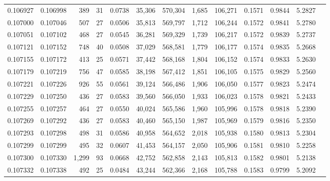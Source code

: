 \begin{tabular}{rrrrrrrrrrrrr}
0.106927 & 0.106998 &   389 &  31 &                                     0.0738 &  35,306 & 570,304 &   1,685 & 106,271 & 0.1571 & 0.9844 & 5.2827 \\
0.107000 & 0.107046 &   507 &  27 &                                     0.0506 &  35,813 & 569,797 &   1,712 & 106,244 & 0.1572 & 0.9841 & 5.2780 \\
0.107051 & 0.107102 &   468 &  27 &                                     0.0545 &  36,281 & 569,329 &   1,739 & 106,217 & 0.1572 & 0.9839 & 5.2737 \\
0.107121 & 0.107152 &   748 &  40 &                                     0.0508 &  37,029 & 568,581 &   1,779 & 106,177 & 0.1574 & 0.9835 & 5.2668 \\
0.107155 & 0.107172 &   413 &  25 &                                     0.0571 &  37,442 & 568,168 &   1,804 & 106,152 & 0.1574 & 0.9833 & 5.2630 \\
0.107179 & 0.107219 &   756 &  47 &                                     0.0585 &  38,198 & 567,412 &   1,851 & 106,105 & 0.1575 & 0.9829 & 5.2560 \\
0.107221 & 0.107226 &   926 &  55 &                                     0.0561 &  39,124 & 566,486 &   1,906 & 106,050 & 0.1577 & 0.9823 & 5.2474 \\
0.107229 & 0.107250 &   436 &  27 &                                     0.0583 &  39,560 & 566,050 &   1,933 & 106,023 & 0.1578 & 0.9821 & 5.2433 \\
0.107255 & 0.107257 &   464 &  27 &                                     0.0550 &  40,024 & 565,586 &   1,960 & 105,996 & 0.1578 & 0.9818 & 5.2390 \\
0.107269 & 0.107292 &   436 &  27 &                                     0.0583 &  40,460 & 565,150 &   1,987 & 105,969 & 0.1579 & 0.9816 & 5.2350 \\
0.107293 & 0.107298 &   498 &  31 &                                     0.0586 &  40,958 & 564,652 &   2,018 & 105,938 & 0.1580 & 0.9813 & 5.2304 \\
0.107299 & 0.107299 &   495 &  32 &                                     0.0607 &  41,453 & 564,157 &   2,050 & 105,906 & 0.1581 & 0.9810 & 5.2258 \\
0.107300 & 0.107330 & 1,299 &  93 &                                     0.0668 &  42,752 & 562,858 &   2,143 & 105,813 & 0.1582 & 0.9801 & 5.2138 \\
0.107332 & 0.107338 &   492 &  25 &                                     0.0484 &  43,244 & 562,366 &   2,168 & 105,788 & 0.1583 & 0.9799 & 5.2092 \\

\end{tabular}
